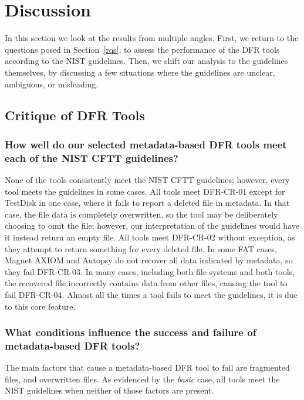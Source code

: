 \section{Discussion}
In this section we look at the results from multiple angles. 
First, we return to the questions posed in Section~\ref{rqs}, to assess the performance of the DFR tools according to the NIST guidelines.
Then, we shift our analysis to the guidelines themselves, by discussing a few situations where the guidelines are unclear, ambiguous, or misleading.

\subsection{Critique of DFR Tools}

\subsubsection{How well do our selected metadata-based DFR tools meet each of the NIST CFTT guidelines?}

None of the tools consistently meet the NIST CFTT guidelines; however, every tool meets the guidelines in some cases.
All tools meet DFR-CR-01 except for TestDisk in one case, where it fails to report a deleted file in metadata.
In that case, the file data is completely overwritten, so the tool may be deliberately choosing to omit the file; however, our interpretation of the guidelines would have it instead return an empty file.
All tools meet DFR-CR-02 without exception, as they attempt to return something for every deleted file.
In some FAT cases, Magnet AXIOM and Autopsy do not recover all data indicated by metadata, so they fail DFR-CR-03.
In many cases, including both file systems and both tools, the recovered file incorrectly contains data from other files, causing the tool to fail DFR-CR-04.
Almost all the times a tool fails to meet the guidelines, it is due to this core feature.


\subsubsection{What conditions influence the success and failure of metadata-based DFR tools?}

The main factors that cause a metadata-based DFR tool to fail are fragmented files, and overwritten files.
As evidenced by the \emph{basic} case, all tools meet the NIST guidelines when neither of those factors are present.

